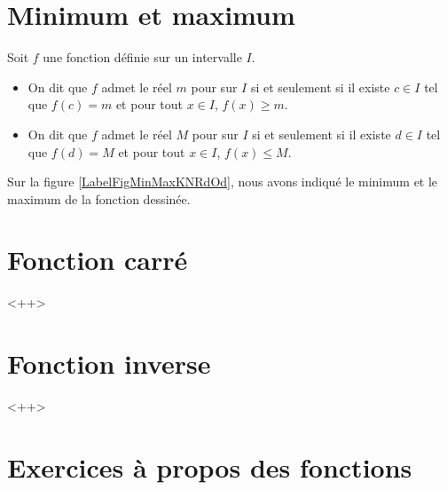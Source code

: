 \section{Minimum et maximum}

\begin{definition}
      Soit $f$ une fonction définie sur un intervalle $I$. \\[-2ex] 
      \begin{itemize}
          \item On dit que $f$ admet le réel $m$ pour 
        sur $I$ si et seulement si il existe $c\in I$ tel que $f(c)=m$
        et pour tout $x\in I$, $f(x)\geq m$. \\[-2ex]
    \item On dit que $f$ admet le réel $M$ pour 
        sur $I$ si et seulement si il existe $d\in I$ tel que $f(d)=M$ et pour tout
        $x\in I$, $f(x)\leq M$.
      \end{itemize}
\end{definition}

Sur la figure \ref{LabelFigMinMaxKNRdOd}, nous avons indiqué le minimum et le maximum de la fonction dessinée.
\newcommand{\CaptionFigMinMaxKNRdOd}{Minimum et maximum d'une fonction.}



\section{Fonction carré}

<++>

\section{Fonction inverse}

<++>

\section{Exercices à propos des fonctions}


